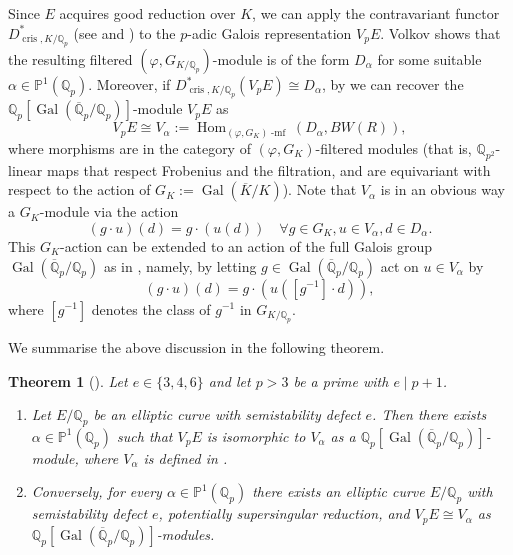 \documentclass{amsart}
\newcommand{\op}[1]{\operatorname{#1}}
\newcommand{\Qp}{\mathbb{Q}_p}
\newcommand{\Qpbar}{\overline{\mathbb{Q}}_p}
\newtheorem{theorem}{Theorem}
\theoremstyle{definition}
\newcommand{\Q}{\mathbb{Q}}
\numberwithin{theorem}{section}
\numberwithin{equation}{section}
\begin{document}
Since $E$ acquires good reduction over $K$, we can apply the contravariant functor $D^*_{\op{cris},K/\Q_p}$ (see \cite[p.~22]{Volkov} and \cite[5.3.7]{MR1293972}) to the $p$-adic Galois representation $V_pE$. Volkov shows \cite[pp.~111-112]{Volkov} that the resulting filtered $(\varphi, G_{K/\Q_p})$-module is of the form $D_\alpha$ for some suitable $\alpha \in \mathbb{P}^1(\Qp)$. Moreover, if $D^*_{\operatorname{cris}, K/\mathbb{Q}_p}(V_pE) \cong D_\alpha$, by \cite[p.~125]{Volkov} we can recover the $\mathbb{Q}_p[\operatorname{Gal}(\overline{\mathbb{Q}}_p/\mathbb{Q}_p)]$-module $V_pE$ as
    \begin{equation}\label{eq: definition of V alpha}
    V_pE \cong V_\alpha := \operatorname{Hom}_{(\varphi, G_K)\operatorname{-mf}}(D_\alpha, BW(R)),
    \end{equation}
where morphisms are in the category of $(\varphi, G_{K})$-filtered modules (that is, $\mathbb{Q}_{p^2}$-linear maps that respect Frobenius and the filtration, and are equivariant with respect to the action of $G_K := \op{Gal}(\overline{K}/K)$). Note that $V_\alpha$ is in an obvious way a $G_K$-module via the action
\[
(g \cdot u)(d) = g \cdot (u(d)) \quad \forall g \in G_K, u \in V_\alpha, d \in D_\alpha.
\]
This $G_K$-action can be extended to an action of the full Galois group $\op{Gal}(\overline{\Q}_p/\Q_p)$ as in \cite[p.~122]{Volkov}, namely, by letting $g \in \operatorname{Gal}(\overline{\Q}_p/\Q_p)$ act on $u \in V_\alpha$ by 
\begin{equation}\label{eq: twisted action}
(g \cdot u)(d) = g \cdot ( u ( [g^{-1}] \cdot d ) ),
\end{equation}
where $[g^{-1}]$ denotes the class of $g^{-1}$ in $G_{K/\Q_p}$. 

We summarise the above discussion in the following theorem.


\begin{theorem}[{\cite[Theorem 2.1 on p.~25 and p.~125]{Volkov}}]\label{thm: Volkov parametrisation}
Let $e \in \{3,4,6\}$ and let $p> 3$ be a prime with $e \mid p+1$.
\begin{enumerate}
    \item Let $E/\Q_p$ be an elliptic curve with semistability defect $e$. Then there exists $\alpha \in \mathbb{P}^1(\Q_p)$ such that $V_pE$ is isomorphic to $V_\alpha$ as a $\Qp[\op{Gal}(\Qpbar/\Qp)]$-module, where $V_\alpha$ is defined in .
    \item Conversely, for every $\alpha \in \mathbb{P}^1(\mathbb{Q}_p)$ there exists an elliptic curve $E/\Q_p$ with semistability defect $e$, potentially supersingular reduction, and $V_pE \cong V_\alpha$ as $\Qp[\op{Gal}(\Qpbar/\Qp)]$-modules.
\end{enumerate}
\end{theorem}
\end{document}
